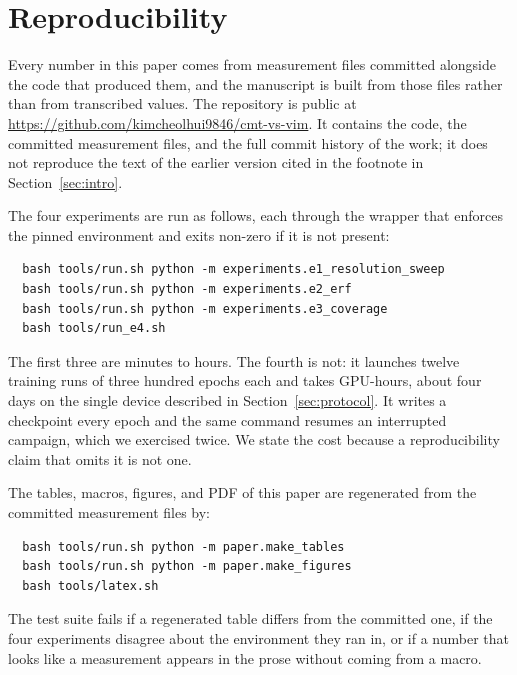 \section*{Reproducibility}

Every number in this paper comes from measurement files committed alongside
the code that produced them, and the manuscript is built from those files
rather than from transcribed values. The repository is public at
\url{https://github.com/kimcheolhui9846/cmt-vs-vim}. It contains the code, the
committed measurement files, and the full commit history of the work; it does
not reproduce the text of the earlier version cited in the footnote in
Section~\ref{sec:intro}.

The four experiments are run as follows, each through the wrapper that
enforces the pinned environment and exits non-zero if it is not present:

\begin{verbatim}
  bash tools/run.sh python -m experiments.e1_resolution_sweep
  bash tools/run.sh python -m experiments.e2_erf
  bash tools/run.sh python -m experiments.e3_coverage
  bash tools/run_e4.sh
\end{verbatim}

The first three are minutes to hours. The fourth is not: it launches twelve
training runs of three hundred epochs each and takes \HoursTotal{} GPU-hours,
about four days on the single device described in
Section~\ref{sec:protocol}. It writes a checkpoint every epoch and the same
command resumes an interrupted campaign, which we exercised twice. We state
the cost because a reproducibility claim that omits it is not one.

The tables, macros, figures, and PDF of this paper are regenerated from the
committed measurement files by:

\begin{verbatim}
  bash tools/run.sh python -m paper.make_tables
  bash tools/run.sh python -m paper.make_figures
  bash tools/latex.sh
\end{verbatim}

The test suite fails if a regenerated table differs from the committed one,
if the four experiments disagree about the environment they ran in, or if a
number that looks like a measurement appears in the prose without coming
from a macro.
